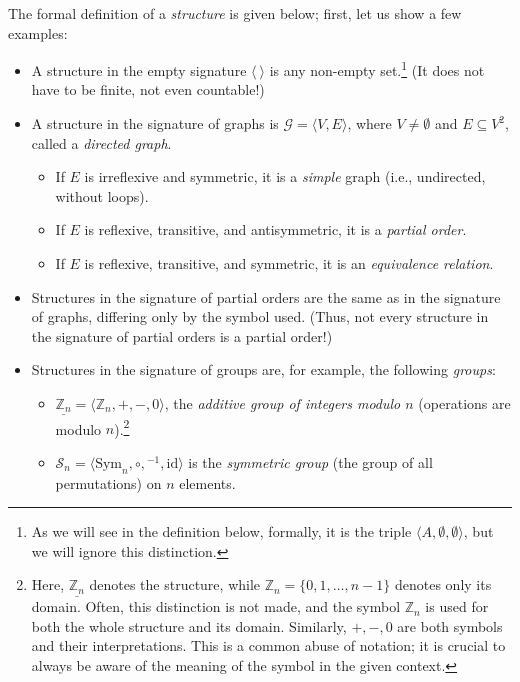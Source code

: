 \begin{example} \label{example:signatures}
    The formal definition of a \emph{structure} is given below; first, let us show a few examples:
\begin{itemize}
    \item A structure in the empty signature $\langle\ \rangle$ is any non-empty set.\footnote{As we will see in the definition below, formally, it is the triple $\langle A,\emptyset,\emptyset\rangle$, but we will ignore this distinction.} (It does not have to be finite, not even countable!)
    \item A structure in the signature of graphs is $\mathcal G=\langle V,E\rangle$, where $V\neq\emptyset$ and $E\subseteq V^2$, called a \emph{directed graph}. 
    \begin{itemize}
        \item If $E$ is irreflexive and symmetric, it is a \emph{simple} graph (i.e., undirected, without loops).
        \item If $E$ is reflexive, transitive, and antisymmetric, it is a \emph{partial order}.
        \item If $E$ is reflexive, transitive, and symmetric, it is an \emph{equivalence relation}.
    \end{itemize}
    \item Structures in the signature of partial orders are the same as in the signature of graphs, differing only by the symbol used. (Thus, not every structure in the signature of partial orders is a partial order!)
    \item Structures in the signature of groups are, for example, the following \emph{groups}:
    \begin{itemize}
        \item $\underline{\mathbb Z_n}=\langle\mathbb Z_n,+,-,0\rangle$, the \emph{additive group of integers modulo $n$} (operations are modulo $n$).\footnote{Here, $\underline{\mathbb Z_n}$ denotes the structure, while $\mathbb Z_n=\{0,1,\dots,n-1\}$ denotes only its domain. Often, this distinction is not made, and the symbol $\mathbb Z_n$ is used for both the whole structure and its domain. Similarly, $+,-,0$ are both symbols and their interpretations. This is a common abuse of notation; it is crucial to always be aware of the meaning of the symbol in the given context.}
        \item $\mathcal S_n=\langle \mathrm{Sym}_n,\circ,{}^{-1},\mathrm{id}\rangle$ is the \emph{symmetric group} (the group of all permutations) on $n$ elements.

\end{itemize}
\end{itemize}
\end{example}
